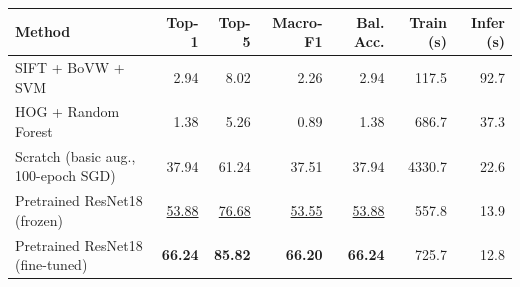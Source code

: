 \begin{tabular}{lrrrrrr}
\toprule
Method & Top-1 & Top-5 & Macro-F1 & Bal. Acc. & Train (s) & Infer (s) \\
\midrule
SIFT + BoVW + SVM & 2.94 & 8.02 & 2.26 & 2.94 & 117.5 & 92.7 \\
HOG + Random Forest & 1.38 & 5.26 & 0.89 & 1.38 & 686.7 & 37.3 \\
Scratch (basic aug., 100-epoch SGD) & 37.94 & 61.24 & 37.51 & 37.94 & 4330.7 & 22.6 \\
Pretrained ResNet18 (frozen) & \underline{53.88} & \underline{76.68} & \underline{53.55} & \underline{53.88} & 557.8 & 13.9 \\
Pretrained ResNet18 (fine-tuned) & \textbf{66.24} & \textbf{85.82} & \textbf{66.20} & \textbf{66.24} & 725.7 & 12.8 \\
\bottomrule
\end{tabular}
